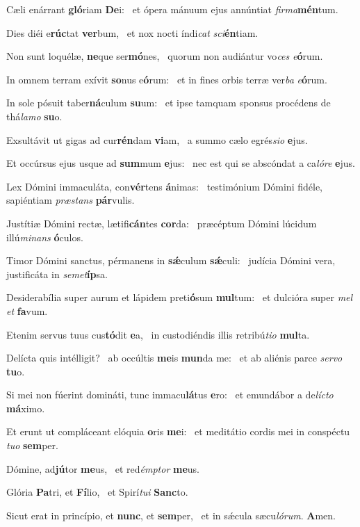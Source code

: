 \item Cæli enárrant \textbf{gló}riam \textbf{De}i:~\psstar{} et ópera mánuum ejus annúntiat \textit{firma}\textbf{mén}tum.
\item Dies diéi e\textbf{rúc}tat \textbf{ver}bum,~\psstar{} et nox nocti índi\textit{cat} \textit{sci}\textbf{én}tiam.
\item Non sunt loquélæ, \textbf{ne}que ser\textbf{mó}nes,~\psstar{} quorum non audiántur vo\textit{ces} \textit{e}\textbf{ó}rum.
\item In omnem terram exívit \textbf{so}nus e\textbf{ó}rum:~\psstar{} et in fines orbis terræ ver\textit{ba} \textit{e}\textbf{ó}rum.
\item In sole pósuit taber\textbf{ná}culum \textbf{su}um:~\psstar{} et ipse tamquam sponsus procédens de thá\textit{lamo} \textbf{su}o.
\item Exsultávit ut gigas ad cur\textbf{rén}dam \textbf{vi}am,~\psstar{} a summo cælo egrés\textit{sio} \textbf{e}jus.
\item Et occúrsus ejus usque ad \textbf{sum}mum \textbf{e}jus:~\psstar{} nec est qui se abscóndat a ca\textit{lóre} \textbf{e}jus.
\item Lex Dómini immaculáta, con\textbf{vér}tens \textbf{á}nimas:~\psstar{} testimónium Dómini fidéle, sapiéntiam \textit{præstans} \textbf{pár}vulis.
\item Justítiæ Dómini rectæ, lætifi\textbf{cán}tes \textbf{cor}da:~\psstar{} præcéptum Dómini lúcidum illú\textit{minans} \textbf{ó}culos.
\item Timor Dómini sanctus, pérmanens in \textbf{sǽ}culum \textbf{sǽ}culi:~\psstar{} judícia Dómini vera, justificáta in \textit{semet}\textbf{íp}sa.
\item Desiderabília super aurum et lápidem preti\textbf{ó}sum \textbf{mul}tum:~\psstar{} et dulcióra super \textit{mel} \textit{et} \textbf{fa}vum.
\item Etenim servus tuus cus\textbf{tó}dit \textbf{e}a,~\psstar{} in custodiéndis illis retribú\textit{tio} \textbf{mul}ta.
\item Delícta quis intélligit?~\pscross{} ab occúltis \textbf{me}is \textbf{mun}da me:~\psstar{} et ab aliénis parce \textit{servo} \textbf{tu}o.
\item Si mei non fúerint domináti, tunc immacu\textbf{lá}tus \textbf{e}ro:~\psstar{} et emundábor a de\textit{lícto} \textbf{má}ximo.
\item Et erunt ut compláceant elóquia \textbf{o}ris \textbf{me}i:~\psstar{} et meditátio cordis mei in conspéctu \textit{tuo} \textbf{sem}per.
\item Dómine, ad\textbf{jú}tor \textbf{me}us,~\psstar{} et red\textit{émptor} \textbf{me}us.
\item Glória \textbf{Pa}tri, et \textbf{Fí}lio,~\psstar{} et Spirí\textit{tui} \textbf{Sanc}to.
\item Sicut erat in princípio, et \textbf{nunc}, et \textbf{sem}per,~\psstar{} et in sǽcula sæcu\textit{lórum}. \textbf{A}men.